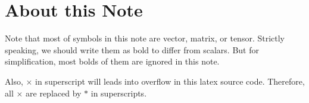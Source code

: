 
\chapter{About this Note} \label{sec:intro}

Note that most of symbols in this note are vector, matrix, or tensor.
Strictly speaking, we should write them as bold to differ from scalars.
But for simplification, most bolds of them are ignored in this note.

Also, $\times$ in superscript will leads into overflow in this latex source code.
Therefore, all $\times$ are replaced by $*$ in superscripts.

\tododcmmc


